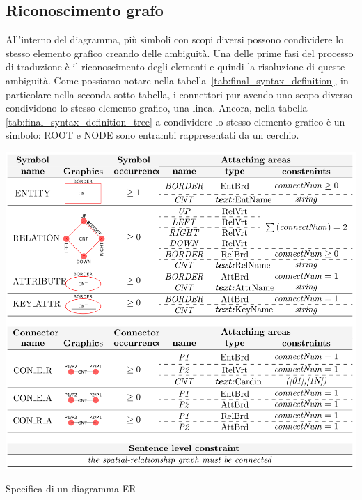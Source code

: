         \subsection{Riconoscimento grafo}
            All'interno del diagramma, più simboli con scopi diversi possono condividere lo stesso elemento grafico creando delle ambiguità. Una delle prime fasi del processo di traduzione è il riconoscimento degli elementi e quindi la risoluzione di queste ambiguità. Come possiamo notare nella tabella~\ref{tab:final_syntax_definition}, in particolare nella seconda sotto-tabella, i connettori pur avendo uno scopo diverso condividono lo stesso elemento grafico, una linea.
            \newline
            Ancora, nella tabella \ref{tab:final_syntax_definition_tree} a condividere lo stesso elemento grafico è un simbolo: ROOT e NODE sono entrambi rappresentati da un cerchio.

            \begin{table}[htbp]
                \centering
                \includegraphics[scale=0.4]{Figure/final_syntax_definition.PNG}
                \caption{Specifica di un diagramma ER}
                \label{tab:final_syntax_definition}
            \end{table}

